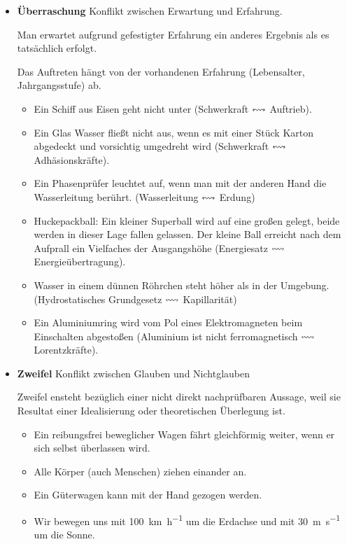 \begin{itemize}
	\item {\bf \"{U}berraschung}
	Konflikt zwischen Erwartung und Erfahrung.
	
	Man erwartet aufgrund gefestigter Erfahrung ein anderes
	Ergebnis als es tats\"{a}chlich erfolgt.
	
	Das Auftreten h\"{a}ngt von der vorhandenen Erfahrung
	(Lebensalter, Jahrgangsstufe) ab.
	\begin{itemize}
		\item
		Ein Schiff aus Eisen geht nicht
		unter (Schwerkraft $\leftrightsquigarrow$ Auftrieb).
		\item
		Ein Glas Wasser flie{\ss}t nicht aus, wenn es mit einer St\"{u}ck
		Karton abgedeckt und vorsichtig umgedreht wird
		(Schwerkraft $\leftrightsquigarrow$ Adh\"{a}sionskr\"{a}fte).
		\item
		Ein Phasenpr\"{u}fer leuchtet auf, wenn man mit der anderen Hand
		die Wasserleitung ber\"{u}hrt. (Wasserleitung $\leftrightsquigarrow$ Erdung)
		\item
		Huckepackball: Ein kleiner Superball wird auf eine gro{\ss}en gelegt,
		beide werden in dieser Lage fallen gelassen.
		Der kleine Ball erreicht nach dem Aufprall ein
		Vielfaches der Ausgangsh\"{o}he
		(Energiesatz $\leftrightsquigarrow$ Energie\"{u}bertragung).
		\item
		Wasser in einem d\"{u}nnen R\"{o}hrchen steht h\"{o}her als in der Umgebung.
		(Hydrostatisches Grundgesetz $\leftrightsquigarrow$ Kapillarit\"{a}t)
		\item
		Ein Aluminiumring wird vom Pol eines Elektromagneten beim
		Einschalten abgesto{\ss}en
		(Aluminium ist nicht ferromagnetisch $\leftrightsquigarrow$ Lorentzkr\"{a}fte).
	\end{itemize}
	
	\item {\bf Zweifel} Konflikt zwischen Glauben und Nichtglauben
	
	Zweifel ensteht bez\"{u}glich einer nicht direkt nachpr\"{u}fbaren
	Aussage, weil sie Resultat einer Idealisierung oder theoretischen
	\"{U}berlegung ist.
	
	\begin{itemize}
		\item
		Ein reibungsfrei beweglicher Wagen f\"{a}hrt gleichf\"{o}rmig weiter,
		wenn er sich selbst \"{u}berlassen wird.
		\item
		Alle K\"{o}rper (auch Menschen) ziehen einander an.
		\item
		Ein G\"{u}terwagen kann mit der Hand gezogen werden.
		\item
		Wir bewegen uns mit \SI{100}{\kilo\meter\per\hour} um die Erdachse und mit \SI{30}{\meter\per\second}
		um die Sonne.
	\end{itemize}
	

\end{itemize}
